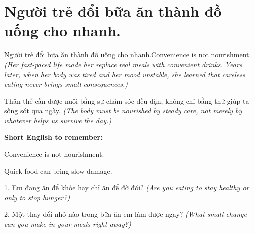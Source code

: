 \section{Người trẻ đổi bữa ăn thành đồ uống cho nhanh.}
\begin{truyen}{Người trẻ đổi bữa ăn thành đồ uống cho nhanh.}{Convenience is not nourishment.}
\textit{(Her fast-paced life made her replace real meals with convenient drinks. Years later, when her body was tired and her mood unstable, she learned that careless eating never brings small consequences.)}
\end{truyen}
\begin{baihoc}
Thân thể cần được nuôi bằng sự chăm sóc đều đặn, không chỉ bằng thứ giúp ta sống sót qua ngày.
\textit{(The body must be nourished by steady care, not merely by whatever helps us survive the day.)}
\end{baihoc}
\begin{ghinhoanh}
\textbf{Short English to remember:}

Convenience is not nourishment.

Quick food can bring slow damage.
\end{ghinhoanh}
\begin{tuhocnhanh}
1. Em đang ăn để khỏe hay chỉ ăn để đỡ đói? \textit{(Are you eating to stay healthy or only to stop hunger?)}

2. Một thay đổi nhỏ nào trong bữa ăn em làm được ngay? \textit{(What small change can you make in your meals right away?)}
\end{tuhocnhanh}
\ngancach

